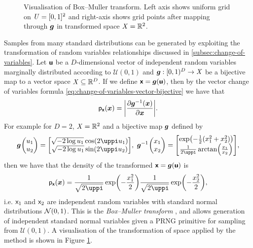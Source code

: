 \begin{figure}
\def\numgrid{11}
\caption[Visualisation of Box--Muller transform.]{Visualisation of Box--Muller transform. Left axis shows uniform grid on $\mathit{U} = [0,1]^2$ and right-axis shows grid points after mapping through $\boldsymbol{g}$ in transformed space $\mathit{X} = \mathbb{R}^2$.}
\label{fig:box-muller-transform}
\end{figure}
\enlargethispage{1\baselineskip}
Samples from many standard distributions can be generated by exploiting the transformation of random variables relationships discussed in \ref{subsec:change-of-variables}. Let $\boldsymbol{\mathsf{u}}$ be a $D$-dimensional vector of independent random variables marginally distributed according to $\mathcal{U}(0,1)$ and $\boldsymbol{g} :  [0,1)^D \to \mathit{X}$ be a bijective map to a vector space $\mathit{X} \subseteq \mathbb{R}^D$. If we define $\boldsymbol{\mathsf{x}} = \boldsymbol{g}(\boldsymbol{\mathsf{u}})$, then by the vector change of variables formula \eqref{eq:change-of-variables-vector-bijective} we have that
\begin{equation}\label{eq:transform-sampling-uniform}
  \pden{\rvct{x}}(\vct{x}) = \left|\pd{\vct{g}^{-1}(\vct{x})}{\vct{x}}\right|.
\end{equation}
For example for $D=2$, $\mathit{X} = \mathbb{R}^2$ and a bijective map $\boldsymbol{g}$ defined by
\begin{equation*}\label{eq:box-muller-transform}
\begin{split}
  \vct{g}\kern0.5pt\begin{pmatrix} u_1\\u_2\end{pmatrix} =
  \begin{bmatrix} \sqrt{-2\log u_1}\cos(2\uppi u_1) \\ \sqrt{-2\log u_1}\sin(2\uppi u_2)\end{bmatrix}
  ,~
  \vct{g}^{-1}\kern0.5pt\begin{pmatrix} x_1\\x_2\end{pmatrix} =
  \begin{bmatrix} \exp\lpa-\frac{1}{2}(x_1^2+x_2^2)\rpa \\ \frac{1}{2\uppi}\arctan\lpa\frac{x_1}{x_2}\rpa\end{bmatrix},
\end{split}
\end{equation*}
then we have that the density of the transformed $\boldsymbol{\mathsf{x}} = \boldsymbol{g}(\boldsymbol{\mathsf{u}})$ is
\begin{equation}\label{eq:box-muller-transform-density}
  \pden{\rvct{x}}(\vct{x}) = 
  \frac{1}{\sqrt{2\uppi}}\exp\lpa-\frac{x_1^2}{2}\rpa
  \frac{1}{\sqrt{2\uppi}}\exp\lpa-\frac{x_2^2}{2}\rpa ,
\end{equation}
i.e. $\mathsf{x}_1$ and $\mathsf{x}_2$ are independent random variables with standard normal distributions $\nrm{0,1}$. This is the \emph{Box--Muller transform} \citep{box1958note}, and allows generation of independent standard normal variables given a \ac{PRNG} primitive for sampling from $\mathcal{U}(0,1)$. A visualisation of the transformation of space applied by the method is shown in Figure \ref{fig:box-muller-transform}. 

